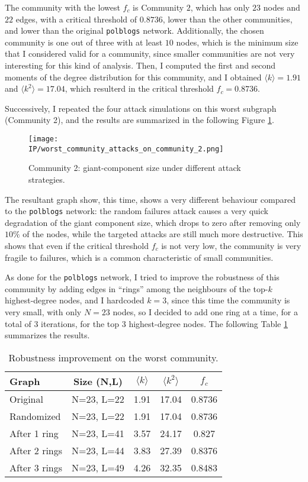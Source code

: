 \documentclass{article}
\newcommand{\IP}{../results}
\begin{document}
The community with the lowest $f_c$ is Community $2$, which has only $23$ nodes and $22$ edges, with a critical threshold of $0.8736$, lower than the other communities, and lower than the original \texttt{polblogs} network. Additionally, the chosen community is one out of three with at least $10$ nodes, which is the minimum size that I considered valid for a community, since smaller communities are not very interesting for this kind of analysis. Then, I computed the first and second moments of the degree distribution for this community, and I obtained $\langle k\rangle=1.91$ and $\langle k^2\rangle=17.04$, which resulterd in the critical threshold $f_c=0.8736$.

Successively, I repeated the four attack simulations on this worst subgraph (Community 2), and the results are summarized in the following Figure \ref{fig:bonus_attacks}.

\begin{figure}[H]
  \centering
  \texttt{[image: \\IP/worst\_community\_attacks\_on\_community\_2.png]}
  \caption{Community 2: giant-component size under different attack strategies.}
  \label{fig:bonus_attacks}
\end{figure}

The resultant graph show, this time, shows a very different behaviour compared to the \texttt{polblogs} network: the random failures attack causes a very quick degradation of the giant component size, which drops to zero after removing only $10\%$ of the nodes, while the targeted attacks are still much more destructive. This shows that even if the critical threshold $f_c$ is not very low, the community is very fragile to failures, which is a common characteristic of small communities.

As done for the \texttt{polblogs} network, I tried to improve the robustness of this community by adding edges in “rings” among the neighbours of the top-$k$ highest-degree nodes, and I hardcoded $k=3$, since this time the community is very small, with only $N=23$ nodes, so I decided to add one ring at a time, for a total of $3$ iterations, for the top $3$ highest-degree nodes. The following Table \ref{tab:bonus:improv} summarizes the results.

\begin{table}[H]
  \centering
  \caption{Robustness improvement on the worst community.}\label{tab:bonus:improv}
  \begin{tabular}{lcccc}
    \toprule
    Graph           & Size (N,L) & $\langle k\rangle$ & $\langle k^2\rangle$ & $f_c$ \\
    \midrule
    Original        & N=23, L=22 & 1.91 & 17.04 & 0.8736 \\
    Randomized      & N=23, L=22 & 1.91 & 17.04 & 0.8736 \\
    After 1 ring    & N=23, L=41 & 3.57 & 24.17 & 0.827  \\
    After 2 rings   & N=23, L=44 & 3.83 & 27.39 & 0.8376 \\
    After 3 rings   & N=23, L=49 & 4.26 & 32.35 & 0.8483 \\
    \bottomrule
  \end{tabular}
\end{table}
\end{document}
